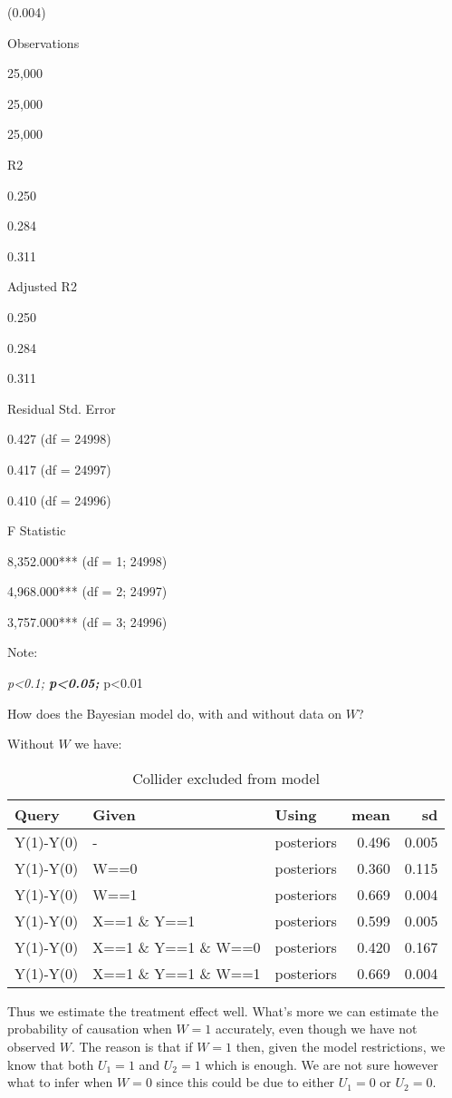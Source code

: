 \documentclass[
  12pt,
]{book}
\begin{document}
(0.004)

Observations

25,000

25,000

25,000

R2

0.250

0.284

0.311

Adjusted R2

0.250

0.284

0.311

Residual Std. Error

0.427 (df = 24998)

0.417 (df = 24997)

0.410 (df = 24996)

F Statistic

8,352.000*** (df = 1; 24998)

4,968.000*** (df = 2; 24997)

3,757.000*** (df = 3; 24996)

Note:

\emph{p\textless0.1; \textbf{p\textless0.05; }}p\textless0.01

How does the Bayesian model do, with and without data on \(W\)?

Without \(W\) we have:

\begin{table}

\caption{\label{tab:applearncoll6}Collider excluded from model}
\centering
\begin{tabular}[t]{l|l|l|r|r}
\hline
Query & Given & Using & mean & sd\\
\hline
Y(1)-Y(0) & - & posteriors & 0.496 & 0.005\\
\hline
Y(1)-Y(0) & W==0 & posteriors & 0.360 & 0.115\\
\hline
Y(1)-Y(0) & W==1 & posteriors & 0.669 & 0.004\\
\hline
Y(1)-Y(0) & X==1 \& Y==1 & posteriors & 0.599 & 0.005\\
\hline
Y(1)-Y(0) & X==1 \& Y==1 \& W==0 & posteriors & 0.420 & 0.167\\
\hline
Y(1)-Y(0) & X==1 \& Y==1 \& W==1 & posteriors & 0.669 & 0.004\\
\hline
\end{tabular}
\end{table}

Thus we estimate the treatment effect well. What's more we can estimate the probability of causation when \(W=1\) accurately, even though we have not observed \(W\). The reason is that if \(W=1\) then, given the model restrictions, we know that both \(U_1=1\) and \(U_2=1\) which is enough. We are not sure however what to infer when \(W=0\) since this could be due to either \(U_1=0\) or \(U_2=0\).
\end{document}
